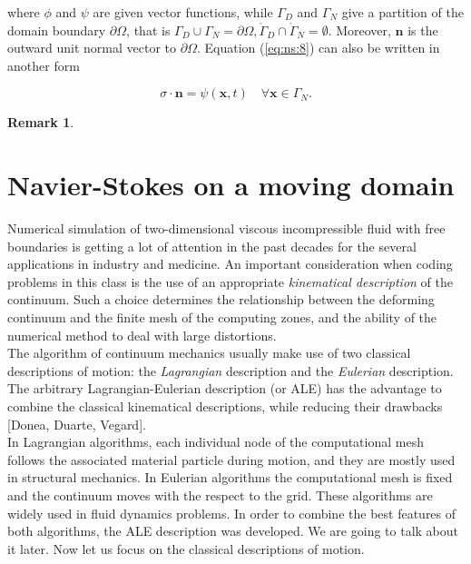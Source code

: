 \documentclass[a4paper,11pt,openright,twoside]{book}
\newtheorem*{remark}{Remark}
\begin{document}
where $\phi$ and $\psi$ are given vector functions, while $\Gamma_D$ and $\Gamma_N$ give a partition of the domain boundary $\partial \Omega$, that is $\Gamma_D 	\cup \Gamma_N = \partial \Omega, \mathring{\Gamma}_D \cap \mathring{\Gamma}_N = \emptyset$. Moreover, $\mathbf{n}$ is the outward unit normal vector to $\partial \Omega$. Equation (\ref{eq:ns:8}) can also be written in another form

\begin{equation}
\sigma \cdot \mathbf{n} = \psi(\mathbf{x}, t)  \quad \forall \mathbf{x} \in \Gamma_N.
\end{equation}

\begin{remark}
\end{remark}


\section{Navier-Stokes on a moving domain}

Numerical simulation of two-dimensional viscous incompressible fluid with free boundaries is getting a lot of attention in the past decades for the several applications in industry and medicine. An important consideration when coding problems in this class is the use of an appropriate \emph{kinematical description} of the continuum. Such a choice determines the relationship between the deforming continuum and the finite mesh of the computing zones, and the ability of the numerical method to deal with large distortions. \\
The algorithm of continuum mechanics usually make use of two classical descriptions of motion: the \emph{Lagrangian} description and the \emph{Eulerian} description. The arbitrary Lagrangian-Eulerian description (or ALE) has the advantage to combine the classical kinematical descriptions, while reducing their drawbacks [Donea, Duarte, Vegard]. \\
In Lagrangian algorithms, each individual node of the computational mesh follows the associated material particle during motion, and they are mostly used in structural mechanics.
In Eulerian algorithms the computational mesh is fixed and the continuum moves with the respect to the grid. These algorithms are widely used in fluid dynamics problems.
In order to combine the best features of both algorithms, the ALE description was developed. We are going to talk about it later. Now let us focus on the classical descriptions of motion.
\end{document}
